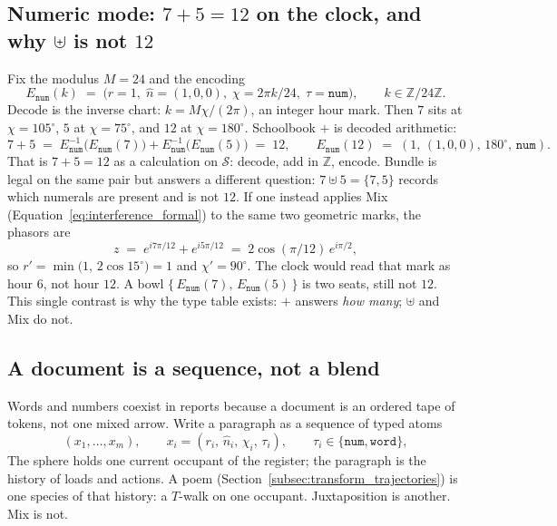 \documentclass[12pt, a4paper]{article}
\begin{document}
\subsection{Numeric mode: $7+5=12$ on the clock, and why $\uplus$ is not $12$}
\label{subsec:clock_encoding}
Fix the modulus $M=24$ and the encoding
\begin{equation}
    E_{\mathtt{num}}(k)
    \;=\;
    \bigl(r=1,\;\hat n=(1,0,0),\;\chi=2\pi k/24,\;\tau=\mathtt{num}\bigr),
    \qquad
    k\in\mathbb{Z}/24\mathbb{Z}.
    \label{eq:clock_encoding}
\end{equation}
Decode is the inverse chart: $k = M\chi/(2\pi)$, an integer hour mark.
Then $7$ sits at $\chi=105^\circ$, $5$ at $\chi=75^\circ$, and $12$ at
$\chi=180^\circ$. Schoolbook $+$ is decoded arithmetic:
\begin{equation}
    7+5
    \;=\;
    E_{\mathtt{num}}^{-1}\bigl(E_{\mathtt{num}}(7)\bigr)
    +
    E_{\mathtt{num}}^{-1}\bigl(E_{\mathtt{num}}(5)\bigr)
    \;=\; 12,
    \qquad
    E_{\mathtt{num}}(12)
    \;=\;
    (1,\,(1,0,0),\,180^\circ,\,\mathtt{num}).
\end{equation}
That is $7+5=12$ as a calculation on $\mathcal{S}$: decode, add in
$\mathbb{Z}$, encode. Bundle is legal on the same pair but answers a
different question: $7\uplus 5=\{7,5\}$ records which numerals are
present and is not $12$. If one instead applies Mix
(Equation~\eqref{eq:interference_formal}) to the same two geometric
marks, the phasors are
\begin{equation}
    z
    \;=\;
    e^{i 7\pi/12} + e^{i 5\pi/12}
    \;=\;
    2\cos(\pi/12)\,e^{i\pi/2},
\end{equation}
so $r'=\min\bigl(1,\,2\cos 15^\circ\bigr)=1$ and $\chi'=90^\circ$.
The clock would read that mark as hour $6$, not hour $12$.
A bowl $\{\,E_{\mathtt{num}}(7),\,E_{\mathtt{num}}(5)\,\}$ is two seats,
still not $12$. This single contrast is why the type table exists:
$+$ answers \emph{how many}; $\uplus$ and Mix do not.

\subsection{A document is a sequence, not a blend}
\label{subsec:document_sequence}
Words and numbers coexist in reports because a document is an ordered
tape of tokens, not one mixed arrow. Write a paragraph as a sequence
of typed atoms
\begin{equation}
    (x_1,\ldots,x_m),
    \qquad
    x_i=(r_i,\,\hat n_i,\,\chi_i,\,\tau_i),
    \qquad
    \tau_i\in\{\mathtt{num},\mathtt{word}\},
    \label{eq:mixed_document}
\end{equation}
The sphere holds one current occupant of the register; the paragraph is the history of
loads and actions. A poem
(Section~\ref{subsec:transform_trajectories}) is one species of that
history: a $T$-walk on one occupant. Juxtaposition is another. Mix is
not.
\end{document}
